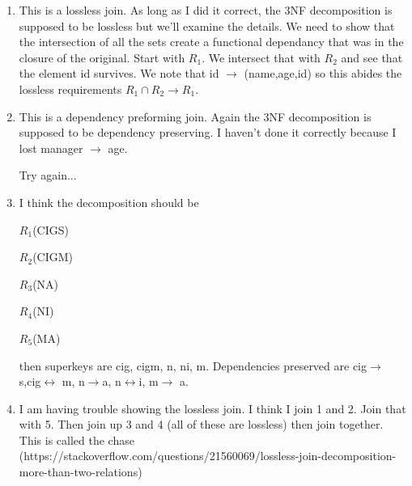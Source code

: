 \documentclass[11pt]{article}
\begin{document}
\begin{enumerate}
\begin{enumerate}
\item This is a lossless join.  As long as I did it correct, the 3NF decomposition is supposed to be lossless but we'll examine the details.  We need to show that the intersection of all the sets create a functional dependancy that was in the closure of the original.  Start with $R_1$.  We intersect that with $R_2$ and see that the element id survives.  We note that id $\rightarrow$ (name,age,id) so this abides the lossless requirements $R_1\cap R_2 \rightarrow R_1$.

\item This is a dependency preforming join.  Again the 3NF decomposition is supposed to be dependency preserving.  I haven't done it correctly because I lost manager $\rightarrow$ age.


Try again...

\item I think the decomposition should be 

$R_1$(CIGS)

$R_2$(CIGM)

$R_3$(NA)

$R_4$(NI)

$R_5$(MA)

then superkeys are cig, cigm, n, ni, m.  Dependencies preserved are cig$\rightarrow$ s,cig$\leftrightarrow$ m, n$\rightarrow$a, n$\leftrightarrow$i, m$\rightarrow$ a.

\item I am having trouble showing the lossless join.  I think I join 1 and 2.  Join that with 5.  Then join up 3 and 4 (all of these are lossless) then join together.  This is called the chase (https://stackoverflow.com/questions/21560069/lossless-join-decomposition-more-than-two-relations)
\end{enumerate}
\end{enumerate}
\end{document}
